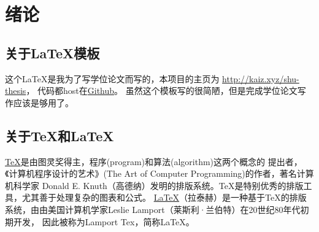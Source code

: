\documentclass[UTF8, fontset=windows]{ctexart}
\numberwithin{equation}{section} %
\numberwithin{table}{section} %
\begin{document}
\linespread{1.6} \selectfont  %

 
\setcounter{page}{7}  %

{\hypersetup{linkcolor=black}
\tableofcontents}

\pagebreak
\section{绪论}
\setcounter{page}{1}
\subsection{关于\LaTeX  模板}
这个\LaTeX  是我为了写学位论文而写的，本项目的主页为 \url{http://kaiz.xyz/shu-thesis}，
代码都host在\href{https://github.com/zeakey/shu-thesis}{Github}。
%
虽然这个模板写的很简陋，但是完成学位论文写作应该是够用了。

\subsection{关于\TeX 和\LaTeX  }
\href{https://en.wikipedia.org/wiki/TeX}{\TeX }是由图灵奖得主，程序(program)和算法(algorithm)这两个概念的
提出者，《计算机程序设计的艺术》(The Art of Computer Programming)的作者，著名计算机科学家
Donald E. Knuth（高德纳）发明的排版系统。TeX是特别优秀的排版工具，尤其善于处理复杂的图表和公式。
%
\href{https://en.wikipedia.org/wiki/LaTeX }{\LaTeX }（拉泰赫）是一种基于\TeX 的排版系统，由由美国计算机学家Leslie Lamport（莱斯利·兰伯特）在20世纪80年代初期开发，
因此被称为Lamport Tex，简称LaTeX。
\end{document}
